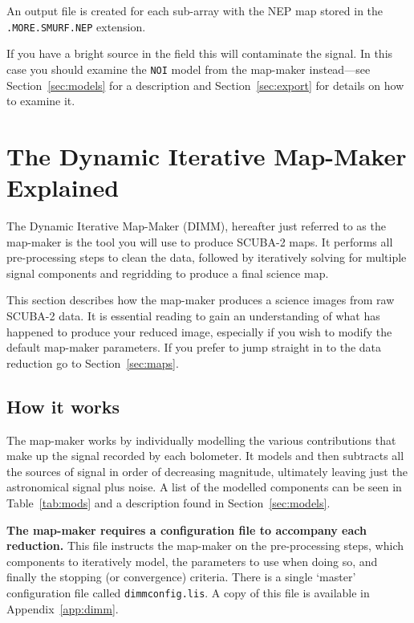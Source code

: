 \documentclass[twoside,11pt]{article}
\newcommand{\htmlref}[2]{#1}
\newcommand{\latexhtml}[2]{#1}
\newcommand{\xlabel}[1]{}
\renewcommand{\_}{\texttt{\symbol{95}}}
\newcommand{\cref}[3]{\latexhtml{#1~\ref{#2}}{\htmlref{#3}{#2}}}
\begin{document}
An output file is created for each sub-array with the NEP map stored
in the \texttt{.MORE.SMURF.NEP} extension.

If you have a bright source in the field this will
contaminate the signal. In this case you should examine the
\texttt{NOI} model from the map-maker instead---see
\cref{Section}{sec:models}{The Individual Models} for a description
and \cref{Section}{sec:export}{Exporting individual models} for
details on how to examine it.

\clearpage
\section{\xlabel{dimm}The Dynamic Iterative Map-Maker Explained}
\label{sec:dimm}

The Dynamic Iterative Map-Maker (DIMM), hereafter just referred to as
the map-maker is the tool you will use to produce SCUBA-2 maps. It
performs all pre-processing steps to clean the data, followed by
iteratively solving for multiple signal components and regridding to
produce a final science map.

This section describes how the map-maker produces a science images
from raw SCUBA-2 data. It is essential reading to gain an
understanding of what has happened to produce your reduced image,
especially if you wish to modify the default map-maker parameters.
\color{red} If you prefer to jump straight in to the data reduction go
to \cref{Section}{sec:maps}{Reducing your data}.\color{black}


\subsection{\xlabel{dimm_theory}How it works}

The map-maker works by individually modelling the various
contributions that make up the signal recorded by each bolometer. It
models and then subtracts all the sources of signal in order of
decreasing magnitude, ultimately leaving just the astronomical signal
plus noise. A list of the modelled components can be seen in
\cref{Table}{tab:mods}{tabulated} and a description found in
\cref{Section}{sec:models}{The Individual Models}.

\textbf{The map-maker requires a configuration file to accompany each
reduction.} This file instructs the map-maker on the pre-processing
steps, which components to iteratively model, the parameters to use
when doing so, and finally the stopping (or convergence) criteria.
There is a single `master' configuration
file called \texttt{dimmconfig.lis}. A copy of this file is available in
\cref{Appendix}{app:dimm}{an appendix}.
\end{document}
